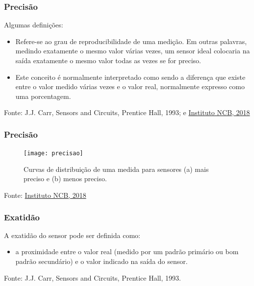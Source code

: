 \documentclass[t]{beamer}
\begin{document}
\begin{frame}
	\frametitle{Precisão}
	Algumas definições:
	\begin{itemize}
		\item  Refere-se ao grau de reproducibilidade de uma medição. Em outras palavras, medindo exatamente o mesmo valor várias vezes, um sensor ideal colocaria na saída exatamente o mesmo valor todas as vezes se for preciso.
		\item Este conceito é normalmente interpretado como sendo a diferença que existe entre o valor medido várias vezes e o valor real, normalmente expresso como uma porcentagem.
	\end{itemize}
	\bigskip
	{\scriptsize Fonte: J.J. Carr, Sensors and Circuits, Prentice Hall, 1993; e  \href{http://www.newtoncbraga.com.br/index.php/eletronica/52-artigos-diversos/4888-art645}{Instituto NCB, 2018}} 
\end{frame}

\begin{frame}
	\frametitle{Precisão}
	\begin{figure}
		\texttt{[image: precisao]}
		\caption{Curvas de distribuição de uma medida para sensores (a) mais preciso e (b) menos preciso.}
	\end{figure}
	{\scriptsize Fonte: \href{http://www.newtoncbraga.com.br/index.php/eletronica/52-artigos-diversos/4888-art645}{Instituto NCB, 2018}}
\end{frame}

\begin{frame}
\frametitle{Exatidão}
A exatidão do sensor pode ser definida como:
\begin{itemize}
	\item a proximidade entre o valor real (medido por um padrão primário ou bom padrão secundário) e o valor indicado na saída do sensor.
\end{itemize}
{\scriptsize Fonte: J.J. Carr, Sensors and Circuits, Prentice Hall, 1993.}
\end{frame}
\end{document}
